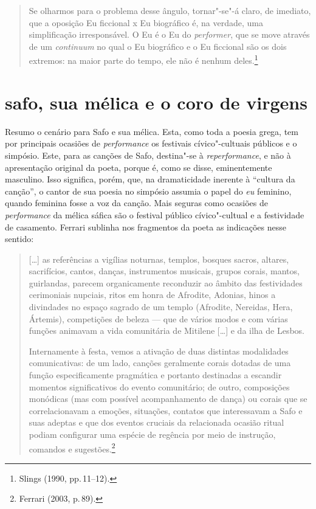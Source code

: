 \begin{quote}
Se olharmos para o problema desse ângulo, tornar"-se"-á claro, de imediato, que
a oposição Eu ficcional x Eu biográfico é, na verdade, uma simplificação
irresponsável. O Eu é o Eu do \emph{performer}, que se move através de um
\emph{continuum} no qual o Eu biográfico e o Eu ficcional são os dois
extremos: na maior parte do tempo, ele não é nenhum deles.\footnote{ Slings (1990, pp.\,11--12).}
\end{quote}


\section*{safo, sua mélica e o coro de virgens}

Resumo o cenário para Safo e sua mélica. Esta, como toda a poesia grega, tem por principais ocasiões de \emph{performance} os festivais cívico"-cultuais públicos e o simpósio. Este, para as canções de Safo, destina"-se à \emph{reperformance}, e não à apresentação original da poeta, porque é, como se disse, eminentemente masculino. Isso significa, porém, que, na dramaticidade inerente à “cultura da canção”, o cantor de sua poesia no simpósio assumia o papel do \emph{eu} feminino, quando feminina fosse a voz da canção. Mais seguras como ocasiões de \emph{performance} da mélica sáfica são o festival público cívico"-cultual e a festividade de casamento. Ferrari sublinha nos fragmentos da poeta as indicações nesse sentido: 

\begin{quote}
{[}\ldots{}{]} as referências a vigílias noturnas, templos, bosques sacros, altares, sacrifícios, cantos, danças, instrumentos musicais, grupos corais, mantos, guirlandas, parecem organicamente reconduzir ao âmbito das festividades cerimoniais nupciais, ritos em honra de Afrodite, Adonias, hinos a divindades no espaço sagrado de um templo (Afrodite, Nereidas, Hera, Ártemis), competições de beleza --- que de vários modos e com várias funções animavam a vida comunitária de Mitilene {[}\ldots{}{]} e da ilha de Lesbos.
	
Internamente à festa, vemos a ativação de duas distintas modalidades comunicativas: de um lado, canções geralmente corais dotadas de uma função especificamente pragmática e portanto destinadas a escandir momentos significativos do evento comunitário; de outro, composições monódicas (mas com possível acompanhamento de dança) ou corais que se correlacionavam a emoções, situações, contatos que interessavam a Safo e suas adeptas e que dos eventos cruciais da relacionada ocasião ritual podiam configurar uma espécie de regência por meio de instrução, comandos e sugestões.\footnote{Ferrari (2003, p.\,89).}
\end{quote}

